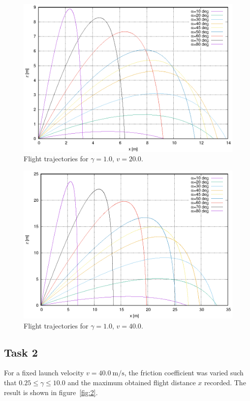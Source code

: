 \documentclass[11pt,a4paper]{article}
\begin{document}
\begin{figure}[ht]
\begin{center}
\includegraphics[scale=1.2]{figure1_3.eps} 
\end{center}
\caption{Flight trajectories for $\gamma = 1.0$, $v= 20.0$.}
\label{fig:1_3}
\end{figure}

\begin{figure}[ht]
\begin{center}
\includegraphics[scale=1.2]{figure1_4.eps} 
\end{center}
\caption{Flight trajectories for $\gamma = 1.0$, $v= 40.0$.}
\label{fig:1_4}
\end{figure}

\subsection{Task 2}
For a fixed launch velocity $v = 40.0\ \text{m/s}$, the friction coefficient was varied such
that $0.25 \le \gamma \le 10.0$ and the maximum obtained flight distance $x$ recorded.
The result is shown in figure~\ref{fig:2}.
\end{document}
